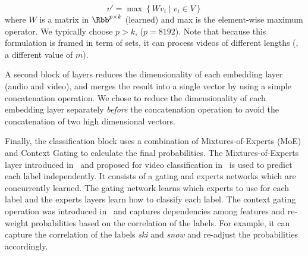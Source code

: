 \begin{equation}
  v' = \max \left\{Wv_{i}\mid v_i \in V \right\}
\end{equation}
where $W$ is a matrix in $\Rbb^{p \times k}$ (learned) and max is the element-wise maximum operator.
We typically choose $p > k$, (\eg $p = 8192$).
Note that because this formulation is framed in term of sets, it can process videos of different lengths (\ie, a different value of $m$).

A second block of layers reduces the dimensionality of each embedding layer (audio and video), and merges the result into a single vector by using a simple concatenation operation.
We chose to reduce the dimensionality of each embedding layer separately \emph{before} the concatenation operation to avoid the concatenation of two high dimensional vectors.

Finally, the classification block uses a combination of Mixtures-of-Experts (MoE) and Context Gating to calculate the final probabilities.
The Mixtures-of-Experts layer introduced in~\cite{jordan1993hierarchical} and proposed for video classification in~\cite{abu2016youtube} is used to predict each label independently.
It consists of a gating and experts networks which are concurrently learned.
The gating network learns which experts to use for each label and the experts layers learn how to classify each label.
The context gating operation was introduced in~\cite{miech2017learnable} and captures dependencies among features and re-weight probabilities based on the correlation of the labels.
For example, it can capture the correlation of the labels \emph{ski} and \emph{snow} and re-adjust the probabilities accordingly. 

